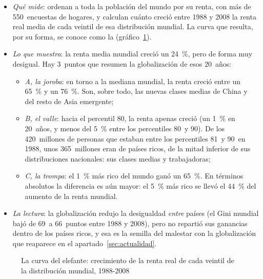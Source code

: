 \documentclass[11pt]{article}
\begin{document}
\begin{itemize}
\item \emph{Qué mide}: \textcite{LaknerMilanovic2016} ordenan a toda la población del mundo por su renta, con más de 550~encuestas de hogares, y calculan cuánto creció entre 1988 y 2008 la renta real media de cada veintil de esa distribución mundial. La curva que resulta, por su forma, se conoce como la  (gráfico~\ref{fig:elefante}).
\item \emph{Lo que muestra}: la renta media mundial creció un 24~\%, pero de forma muy desigual. Hay 3~puntos que resumen la globalización de esos 20~años:
  \begin{itemize}
  \item \emph{A, la joroba}: en torno a la mediana mundial, la renta creció entre un 65~\% y un 76~\%. Son, sobre todo, las nuevas clases medias de China y del resto de Asia emergente;
  \item \emph{B, el valle}: hacia el percentil 80, la renta apenas creció (un 1~\% en 20~años, y menos del 5~\% entre los percentiles 80~y 90)\nocite{LaknerMilanovic2013WP}. De los 420~millones de personas que estaban entre los percentiles 81~y 90~en 1988, unos 365~millones eran de países ricos, de la mitad inferior de sus distribuciones nacionales: sus clases medias y trabajadoras;
  \item \emph{C, la trompa}: el 1~\% más rico del mundo ganó un 65~\%. En términos absolutos la diferencia es aún mayor: el 5~\% más rico se llevó el 44~\% del aumento de la renta mundial.
  \end{itemize}
\item \emph{La lectura}: la globalización redujo la desigualdad \emph{entre} países (el Gini mundial bajó de 69~a 66~puntos entre 1988 y 2008), pero no repartió sus ganancias dentro de los países ricos, y esa es la semilla del malestar con la globalización que reaparece en el apartado~\ref{sec:actualidad}\nocite{Milanovic2024ThreeEras}.
\end{itemize}

\begin{figure}[H]
\centering
\caption{La curva del elefante: crecimiento de la renta real de cada veintil de la distribución mundial, 1988-2008}\label{fig:elefante}
\end{figure}
\end{document}
